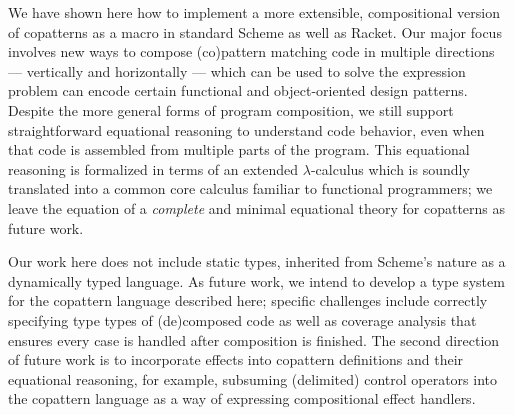 We have shown here how to implement a more extensible, compositional version of copatterns as a macro in standard Scheme as well as Racket.
Our major focus involves new ways to compose (co)pattern matching code in multiple directions --- vertically and horizontally --- which can be used to solve the expression problem can encode certain functional and object-oriented design patterns.
Despite the more general forms of program composition, we still support straightforward equational reasoning to understand code behavior, even when that code is assembled from multiple parts of the program.
This equational reasoning is formalized in terms of an extended $\lambda$-calculus which is soundly translated into a common core calculus familiar to functional programmers;
we leave the equation of a \emph{complete} and minimal equational theory for copatterns as future work.

Our work here does not include static types, inherited from Scheme's nature as a dynamically typed language.
As future work, we intend to develop a type system for the copattern language described here; specific challenges include correctly specifying type types of (de)composed code as well as coverage analysis that ensures every case is handled after composition is finished.
The second direction of future work is to incorporate effects into copattern definitions and their equational reasoning, for example, subsuming (delimited) control operators into the copattern language as a way of expressing compositional effect handlers.


